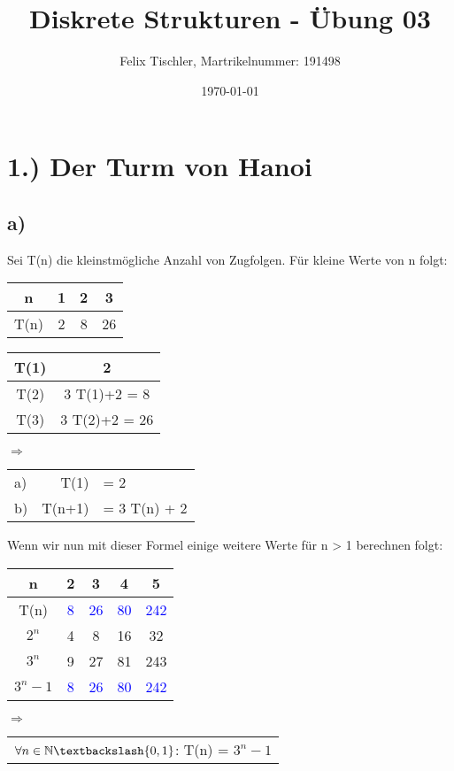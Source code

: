 \documentclass[titlepage]{article}
\begin{document}
	
	\title{Diskrete Strukturen - Übung 03}
	\author{Felix Tischler, Martrikelnummer: 191498}
	\date{\today}
	\maketitle
	
	\section*{1.) Der Turm von Hanoi}
		\subsection*{a)}
		Sei T(n) die kleinstmögliche Anzahl von Zugfolgen. Für kleine Werte von n folgt:
		\begin{table}[h]
			\begin{tabular}{c|ccc}
				n&1&2&3\\\hline
				T(n)&2&8&26
			\end{tabular}
		\quad
			\begin{tabular}{c|c}
				T(1)&2\\\hline
				T(2)&3 T(1)+2 = 8\\\hline
				T(3)&3 T(2)+2 = 26\\
			\end{tabular}
		\quad$\Rightarrow$\quad
			\begin{tabular}{lrl}
				a)& T(1) &= 2\\
				b)& T(n+1) &= 3 T(n) + 2
			\end{tabular}
		\end{table}
	
		\noindent
		Wenn wir nun mit dieser Formel einige weitere Werte für n > 1 berechnen folgt:
		\begin{table}[h]
			\begin{tabular}{c|cccc}
				n&2&3&4&5\\\hline
				T(n)&\textcolor{blue}{8}&\textcolor{blue}{26}&\textcolor{blue}{80}&\textcolor{blue}{242}\\
				$2^n$&4&8&16&32\\
				$3^n$&9&27&81&243\\
				$3^n-1$&\textcolor{blue}{8}&\textcolor{blue}{26}&\textcolor{blue}{80}&\textcolor{blue}{242}
			\end{tabular}
		\quad$\Rightarrow$\quad
			\begin{tabular}{c}
				$\forall n \in\mathbb{N}\textbackslash\{0,1\}$: T(n) = $3^n-1$
			\end{tabular}
		\end{table}
	
\end{document}
